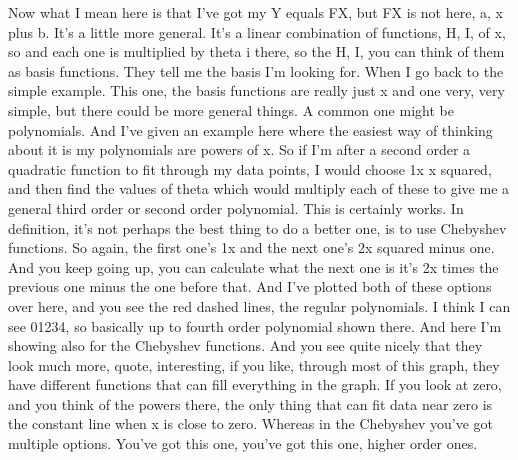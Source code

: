 \documentclass[11pt,a4paper]{article}
\begin{document}
Now what I mean here is that I've got my Y equals FX, but FX is not here, a, x plus b. It's a little more general. It's a linear combination of functions, H, I, of x, so and each one is multiplied by theta i there, so the H, I, you can think of them as basis functions. They tell me the basis I'm looking for. When I go back to the simple example. This one, the basis functions are really just x and one very, very simple, but there could be more general things. A common one might be polynomials. And I've given an example here where the easiest way of thinking about it is my polynomials are powers of x. So if I'm after a second order a quadratic function to fit through my data points, I would choose 1x x squared, and then find the values of theta which would multiply each of these to give me a general third order or second order polynomial. This is certainly works. In definition, it's not perhaps the best thing to do a better one, is to use Chebyshev functions. So again, the first one's 1x and the next one's 2x squared minus one. And you keep going up, you can calculate what the next one is it's 2x times the previous one minus the one before that. And I've plotted both of these options over here, and you see the red dashed lines, the regular polynomials. I think I can see 01234, so basically up to fourth order polynomial shown there. And here I'm showing also for the Chebyshev functions. And you see quite nicely that they look much more, quote, interesting, if you like, through most of this graph, they have different functions that can fill everything in the graph. If you look at zero, and you think of the powers there, the only thing that can fit data near zero is the constant line when x is close to zero. Whereas in the Chebyshev you've got multiple options. You've got this one, you've got this one, higher order ones.
\end{document}
